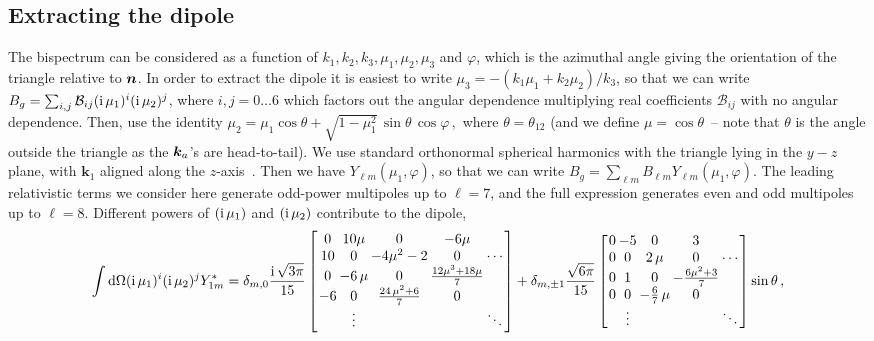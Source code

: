 \subsection*{Extracting the dipole}

The bispectrum can be considered as a function of
$k_1,k_2,k_3,\mu_1, \mu_2,\mu_3$ and $\varphi$, which is the azimuthal angle giving the orientation of the triangle  relative to $\bm {n}$. In order to extract the dipole it is easiest to write $\mu_3=-(k_1\mu_1+k_2\mu_2)/k_3$, so that we can write $B_g = \sum_{i,j} \mathcal{B}_{ij}(\mathrm{i\,}\mu_1)^i(\mathrm{i\,}\mu_2)^j$, where $i,j=0\ldots6$ which factors out the angular dependence multiplying real coefficients $\mathcal{B}_{ij}$ with no angular dependence. Then,
 use the identity 
$%
\mu_2=\mu_1\cos\theta+\sqrt{1-\mu_1^2}\,\sin\theta\,\cos\varphi\,,
$ %
where $\theta=\theta_{12}$ (and we define $\mu=\cos\theta$~-- note that $\theta$ is the angle outside the triangle as the $\bm {k}_a$'s are head-to-tail). We use standard orthonormal spherical harmonics with the triangle lying in the $y-z$ plane, with $\bm k_1$ aligned along the $z$-axis~\citep{Nan:2017oaq}. Then we have $Y_{\ell m}(\mu_1,\varphi)$, so that we can write $B_g =\sum_{\ell m} B_{\ell m}Y_{\ell m}(\mu_1,\varphi)$. The leading relativistic terms we consider here generate odd-power multipoles up to $\ell=7$, and the full expression generates even and odd multipoles up to $\ell=8$.
Different powers of $(\mathrm{i\,}\mu_1)$ and $(\mathrm{i\,}\mu_2)$ contribute to the dipole, 
\begin{equation}
\arraycolsep=1.0pt\def\arraystretch{1}
\int\mathrm{d}\Omega (\i\mu_1)^i  (\i \mu_2)^j Y^*_{1 m} = 
 \delta_{m,0}\frac{\i\sqrt{3\pi}}{15}\left[ \begin {array}{ccccc} 
 0&10\mu&0&-6\mu  &\\ 
10&0&-4{\mu}^{2}-2&0& \cdots\\ 
0&-6\,\mu&0&{\frac {12{
\mu}^{3}+18\mu}{7}}& \\ 
-6&0&{\frac {24
\,{\mu}^{2}+6}{7}}&0& \\
 &\vdots & & & \ddots
\end {array} \right] 
+
\delta_{m,\pm1}\frac{\sqrt{6\pi}}{15}
 \left[ \begin {array}{ccccc} 0&-5&0&3&\\ 
 0&0&2\,\mu&0
& \cdots\\ 
0&1&0&-\frac{6{\mu}^{2}+3}{7}&\\ 
0&0
&-\frac{6}{7}\,\mu&0&\\
 &\vdots & & & \ddots
\end {array} \right] \sin\theta\,,
\label{dkjsncdjcnsk}
\end{equation}
